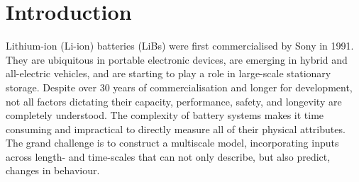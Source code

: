 \documentclass[../main.tex]{subfiles}
\begin{document}
\section{Introduction}
\label{sec:intro}




Lithium-ion (Li-ion) batteries (LiBs) were first commercialised by Sony in 1991. \cite{zeng2019commercialization} They are ubiquitous in portable electronic devices, are emerging in hybrid and all-electric vehicles, \cite{Goodenough2010} and are starting to play a role in large-scale stationary storage. \cite{kubiak2017calendar} Despite over 30 years of commercialisation and longer for development, not all factors dictating their capacity, performance, safety, and longevity are completely understood. The complexity of battery systems makes it time consuming and impractical to directly measure all of their physical attributes. The grand challenge is to construct a multiscale model, incorporating inputs across length- and time-scales that can not only describe, but also predict, changes in behaviour.
\end{document}
